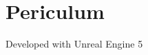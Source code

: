 \chapter{Periculum }
\hypertarget{index}{}\label{index}
\label{index_md__docs_2_r_e_a_d_m_e}%
%


Developed with Unreal Engine 5 